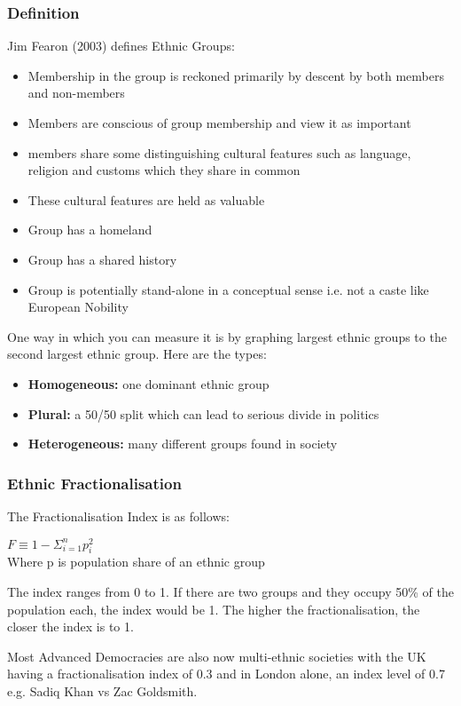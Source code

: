 \documentclass[12pt, letterpaper]{article}
\begin{document}
\subsubsection{Definition}
Jim Fearon (2003) defines Ethnic Groups:
\begin{itemize}
	\item Membership in the group is reckoned primarily by descent by both members and non-members
	\item Members are conscious of group membership and view it as important
	\item members share some distinguishing cultural features such as language, religion and customs which they share in common
	\item These cultural features are held as valuable
	\item Group has a homeland
	\item Group has a shared history
	\item Group is potentially stand-alone in a conceptual sense i.e. not a caste like European Nobility
\end{itemize}
One way in which you can measure it is by graphing largest ethnic groups to the second largest ethnic group. Here are the types:
\begin{itemize}
	\item \textbf{Homogeneous:} one dominant ethnic group
	\item \textbf{Plural:} a 50/50 split which can lead to serious divide in politics
	\item \textbf{Heterogeneous:} many different groups found in society
\end{itemize}

\subsubsection{Ethnic Fractionalisation}
The Fractionalisation Index is as follows:
\begin{center}
	$F \equiv 1 - \Sigma ^n _{i=1} p^2_i$\\
	Where p is population share of an ethnic group
\end{center}
The index ranges from 0 to 1. If there are two groups and they occupy 50\% of the population each, the index would be 1. The higher the fractionalisation, the closer the index is to 1.

Most Advanced Democracies are also now multi-ethnic societies with the UK having a fractionalisation index of 0.3 and in London alone, an index level of 0.7 e.g. Sadiq Khan vs Zac Goldsmith.
\end{document}
